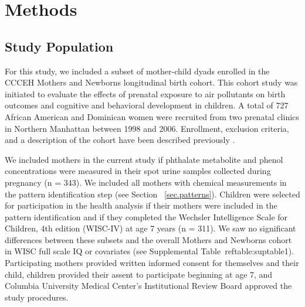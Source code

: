 \section{Methods}

\subsection{Study Population}
For this study, we included a subset of mother-child dyads enrolled in the CCCEH Mothers and Newborns longitudinal birth cohort. This cohort study was initiated to evaluate the effects of prenatal exposure to air pollutants on birth outcomes and cognitive and behavioral development in children. A total of 727 African American and Dominican women were recruited from two prenatal clinics in Northern Manhattan between 1998 and 2006. Enrollment, exclusion criteria, and a description of the cohort have been described previously \citep{perera03}.

We included mothers in the current study if phthalate metabolite and phenol concentrations were measured in their spot urine samples collected during pregnancy (n = 343). We included all mothers with chemical measurements in the pattern identification step (see Section ~\ref{sec.patterns}). Children were selected for participation in the health analysis if their mothers were included in the pattern identification and if they completed the Wechsler Intelligence Scale for Children, 4th edition (WISC-IV) at age 7 years (n = 311). We saw no significant differences between these subsets and the overall Mothers and Newborns cohort in WISC full scale IQ or covariates (see Supplemental Table~ref{table:suptable1}). Participating mothers provided written informed consent for themselves and their child, children provided their assent to participate beginning at age 7, and Columbia University Medical Center's Institutional Review Board approved the study procedures.

